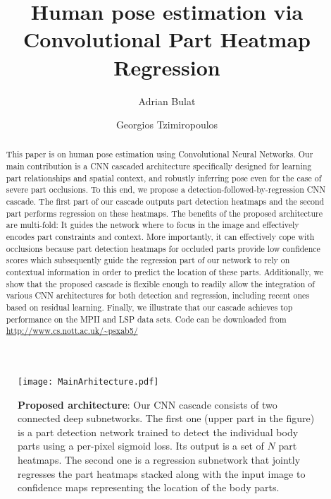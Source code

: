 \documentclass[runningheads]{llncs}
\begin{document}
\pagestyle{headings}
\mainmatter

\title{Human pose estimation via Convolutional Part Heatmap Regression} 



\author{
	Adrian Bulat 
	\and 
    Georgios Tzimiropoulos
}





\maketitle

\begin{abstract}
This paper is on human pose estimation using Convolutional Neural Networks. Our main contribution is a CNN cascaded architecture specifically designed for learning part relationships and spatial context, and robustly inferring pose even for the case of severe part occlusions. To this end, we propose a detection-followed-by-regression CNN cascade. The first part of our cascade outputs part detection heatmaps and the second part performs regression on these heatmaps. The benefits of the proposed architecture are multi-fold: It guides the network where to focus in the image and effectively encodes part constraints and context. More importantly, it can effectively cope with occlusions because part detection heatmaps for occluded parts provide low confidence scores which subsequently guide the regression part of our network to rely on contextual information in order to predict the location of these parts. Additionally, we show that the proposed cascade is flexible enough to readily allow the integration of various CNN architectures for both detection and regression, including recent ones based on residual learning. Finally, we illustrate that our cascade achieves top performance on the MPII and LSP data sets. Code can be downloaded from  \url{http://www.cs.nott.ac.uk/~psxab5/}

\end{abstract}

\begin{figure}
\centering 
\texttt{[image: MainArhitecture.pdf]}
\caption{\textbf{Proposed architecture}: Our CNN cascade consists of two connected deep subnetworks. The first one (upper part in the figure) is a part detection network trained to detect the individual body parts using a per-pixel sigmoid loss. Its output is a set of $N$ part heatmaps. The second one is a regression subnetwork that jointly regresses the part  heatmaps stacked along with the input image to confidence maps representing the location of the body parts.}
\label{fig:OurNetworkFArchFull}
\end{figure}  
\end{document}
